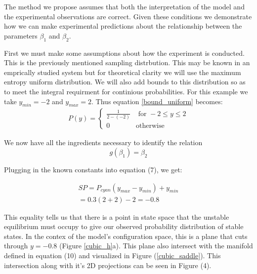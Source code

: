 \documentclass[letterpaper]{article}
\begin{document}
The method we propose assumes that both the interpretation of the model and the
experimental observations are correct. Given these conditions we demonstrate 
how we can make experimental predictions about the relationship between the 
parameters $\beta_1$ and $\beta_2$.

First we must make some assumptions
about how the experiment is conducted. This is the previously mentioned 
sampling distrbution.
This may be known in an emprically studied system but for theoretical 
clarity we will use the maximum entropy uniform distribution. We will also add
bounds to this distribution so as to meet the integral requirment for continious
probabilities. For this example we take $y_{min} = -2$ and $y_{max} = 2$.
Thus equation \ref{bound_uniform} becomes:
\begin{eqnarray}
  \label{p_cubic}
    P(y) = \begin{cases}
        \frac{1}{2 - (-2)} & \text{ for } -2\leq y\leq 2\\
        0 & \text{otherwise}
    \end{cases}
\end{eqnarray}

We now have all the 
ingredients necessary to identify the relation 
\[g(\beta_1) = \beta_2\]

Plugging in the known constants into equation (7), we get:

\begin{equation}
  \begin{aligned}
  SP = P_{cyan}(y_{max}-y_{min}) + y_{min}\\
  = 0.3(2 + 2) - 2 = -0.8
  \end{aligned}
\end{equation}

This equality tells us that there is a point in state space that 
the unstable equilibrium
must occupy to give our observed probability distribution of stable states.
In the contex of the model's configuration space, this is a plane that cuts through
$y = -0.8$ (Figure \ref{cubic_h}a). This plane also intersect with the 
manifold defined in equation (10) and visualized in Figure (\ref{cubic_saddle}).
This intersection along with it's 2D projections can be seen in 
Figure (4). 
\end{document}
